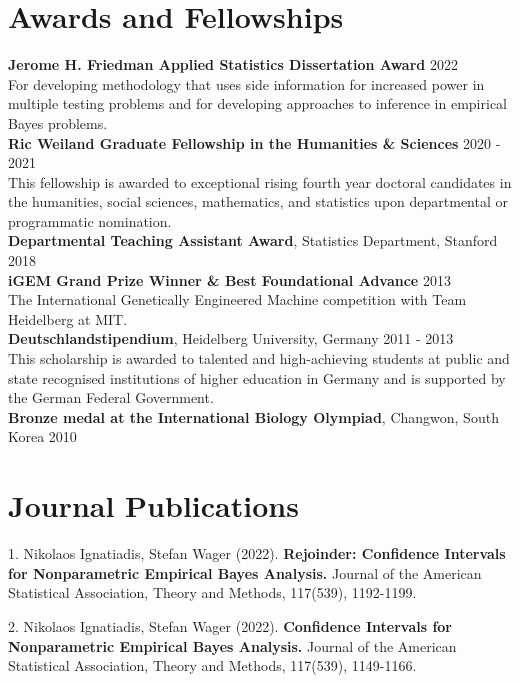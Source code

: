 \documentclass[margin,line]{res}
\newenvironment{list1}{
  \begin{list}{\ding{113}}{%
      \setlength{\itemsep}{0in}
      \setlength{\parsep}{0in} \setlength{\parskip}{0in}
      \setlength{\topsep}{0in} \setlength{\partopsep}{0in}
      \setlength{\leftmargin}{0.17in}}}{\end{list}}
\begin{document}
\begin{resume}
\section{\sc Awards and Fellowships }
\textbf{Jerome H. Friedman Applied Statistics Dissertation Award} \hfill 2022\\
For developing methodology that uses side information for increased power in multiple testing problems and for developing approaches to inference in empirical Bayes problems.\\
\textbf{Ric Weiland Graduate Fellowship  in the Humanities \& Sciences } \hfill 2020 - 2021\\
This fellowship is awarded to exceptional rising fourth year doctoral candidates in the humanities, social sciences, mathematics, and
statistics upon departmental or programmatic nomination.\\
\textbf{Departmental Teaching Assistant Award}, Statistics Department, Stanford  \hfill  2018\\
\textbf{iGEM Grand Prize Winner \& Best Foundational Advance} \hfill  2013 \\
The International Genetically Engineered Machine competition with Team Heidelberg at MIT.\\
\textbf{Deutschlandstipendium}, Heidelberg University, Germany \hfill 2011 - 2013\\
This scholarship is awarded to talented and high-achieving students at public and state recognised institutions of higher education in Germany and is supported by the German Federal Government.\\
\textbf{Bronze medal at the International Biology Olympiad}, Changwon, South Korea \hfill 2010

\section{\sc Journal Publications}
\begin{list1}

\item[1.]
Nikolaos Ignatiadis, Stefan Wager (2022).
\textbf{Rejoinder: Confidence Intervals for Nonparametric Empirical Bayes Analysis.}
Journal of the American Statistical Association, Theory and Methods, 117(539), 1192-1199.

\item[2.]
Nikolaos Ignatiadis, Stefan Wager (2022).
\textbf{Confidence Intervals for Nonparametric Empirical Bayes Analysis.}
Journal of the American Statistical Association, Theory and Methods, 117(539), 1149-1166.


\end{list1}
\end{resume}
\end{document}
